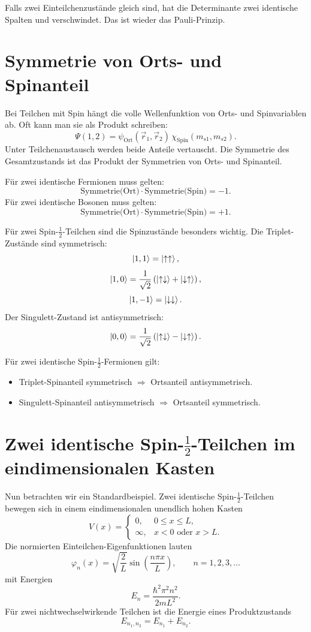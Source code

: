 Falls zwei Einteilchenzustände gleich sind, hat die Determinante zwei identische Spalten und verschwindet. Das ist wieder das Pauli-Prinzip.

\section{Symmetrie von Orts- und Spinanteil}

Bei Teilchen mit Spin hängt die volle Wellenfunktion von Orts- und Spinvariablen ab. Oft kann man sie als Produkt schreiben:
\[
    \Psi(1,2)=\psi_{\text{Ort}}(\vec r_1,\vec r_2)\,\chi_{\text{Spin}}(m_{s1},m_{s2}).
\]
Unter Teilchenaustausch werden beide Anteile vertauscht. Die Symmetrie des Gesamtzustands ist das Produkt der Symmetrien von Orts- und Spinanteil.

\begin{formulabox}
Für zwei identische Fermionen muss gelten:
\[
    \text{Symmetrie(Ort)}\cdot\text{Symmetrie(Spin)}=-1.
\]
Für zwei identische Bosonen muss gelten:
\[
    \text{Symmetrie(Ort)}\cdot\text{Symmetrie(Spin)}=+1.
\]
\end{formulabox}

Für zwei Spin-\(\frac12\)-Teilchen sind die Spinzustände besonders wichtig. Die Triplet-Zustände sind symmetrisch:
\[
    \left|1,1\right\rangle=\left|\uparrow\uparrow\right\rangle,
\]
\[
    \left|1,0\right\rangle=\frac{1}{\sqrt2}
    \left(\left|\uparrow\downarrow\right\rangle+\left|\downarrow\uparrow\right\rangle\right),
\]
\[
    \left|1,-1\right\rangle=\left|\downarrow\downarrow\right\rangle.
\]
Der Singulett-Zustand ist antisymmetrisch:
\[
    \left|0,0\right\rangle=\frac{1}{\sqrt2}
    \left(\left|\uparrow\downarrow\right\rangle-\left|\downarrow\uparrow\right\rangle\right).
\]

\begin{examplebox}
Für zwei identische Spin-\(\frac12\)-Fermionen gilt:
\begin{itemize}
    \item Triplet-Spinanteil symmetrisch \(\Rightarrow\) Ortsanteil antisymmetrisch.
    \item Singulett-Spinanteil antisymmetrisch \(\Rightarrow\) Ortsanteil symmetrisch.
\end{itemize}
\end{examplebox}

\section{Zwei identische Spin-\texorpdfstring{\(\frac12\)}{1/2}-Teilchen im eindimensionalen Kasten}

Nun betrachten wir ein Standardbeispiel. Zwei identische Spin-\(\frac12\)-Teilchen bewegen sich in einem eindimensionalen unendlich hohen Kasten
\[
    V(x)=
    \begin{cases}
    0, & 0\le x\le L,\\
    \infty, & x<0\text{ oder }x>L.
    \end{cases}
\]
Die normierten Einteilchen-Eigenfunktionen lauten
\[
    \varphi_n(x)=\sqrt{\frac{2}{L}}\sin\left(\frac{n\pi x}{L}\right),
    \qquad n=1,2,3,\dots
\]
mit Energien
\[
    E_n=\frac{\hbar^2\pi^2n^2}{2mL^2}.
\]
Für zwei nichtwechselwirkende Teilchen ist die Energie eines Produktzustands
\[
    E_{n_1,n_2}=E_{n_1}+E_{n_2}.
\]

